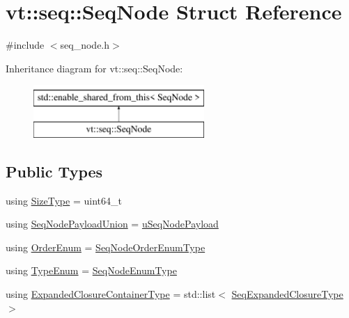 \hypertarget{structvt_1_1seq_1_1_seq_node}{}\section{vt\+:\+:seq\+:\+:Seq\+Node Struct Reference}
\label{structvt_1_1seq_1_1_seq_node}


{\ttfamily \#include $<$seq\+\_\+node.\+h$>$}

Inheritance diagram for vt\+:\+:seq\+:\+:Seq\+Node\+:\begin{figure}[H]
\begin{center}
\leavevmode
\includegraphics[height=2.000000cm]{structvt_1_1seq_1_1_seq_node}
\end{center}
\end{figure}
\subsection*{Public Types}
\begin{DoxyCompactItemize}
\item 
using \hyperlink{structvt_1_1seq_1_1_seq_node_af2b8ae88c3519f2a6142915ddc974c9d}{Size\+Type} = uint64\+\_\+t
\item 
using \hyperlink{structvt_1_1seq_1_1_seq_node_a4550535aff445a28557a1edb9508a6bc}{Seq\+Node\+Payload\+Union} = \hyperlink{unionvt_1_1seq_1_1u_seq_node_payload}{u\+Seq\+Node\+Payload}
\item 
using \hyperlink{structvt_1_1seq_1_1_seq_node_a1a934ba4a7da31ed1fa9c7789b8448ac}{Order\+Enum} = \hyperlink{namespacevt_1_1seq_a313357c71bba2bea5c57f50d69f1edf7}{Seq\+Node\+Order\+Enum\+Type}
\item 
using \hyperlink{structvt_1_1seq_1_1_seq_node_ac24353353c002acd8c5d6aa533533216}{Type\+Enum} = \hyperlink{namespacevt_1_1seq_ae721d4e8b95cf57a7e4169db1929e0f1}{Seq\+Node\+Enum\+Type}
\item 
using \hyperlink{structvt_1_1seq_1_1_seq_node_aff21f386bb9bce2ce5c940edffcdb0a0}{Expanded\+Closure\+Container\+Type} = std\+::list$<$ \hyperlink{namespacevt_1_1seq_a322533ee3b8e3443e6808410aea39797}{Seq\+Expanded\+Closure\+Type} $>$
\end{DoxyCompactItemize}
